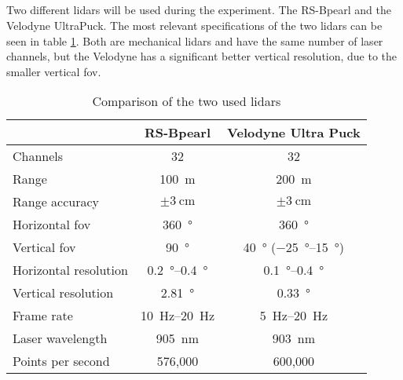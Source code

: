 \subsection{}
Two different \gls{lidar}s will be used during the experiment.
The RS-Bpearl and the Velodyne UltraPuck.
The most relevant specifications of the two \gls{lidar}s can be seen in table \ref{tab:lidar_datasheets}.
Both are mechanical \gls{lidar}s and have the same number of laser channels, but the Velodyne has a significant better vertical resolution, due to the smaller vertical \gls{fov}.
\begin{table}[ht]
	\centering
	\caption{Comparison of the two used \gls{lidar}s \cite{RoboSense2020}\cite{Rev}}
	\label{tab:lidar_datasheets}
	\begin{tabular}[t]{lcc}
	\toprule
	&\textbf{RS-Bpearl} & \textbf{Velodyne Ultra Puck}\\
	\midrule
	Channels 					& 32 							& 32\\
	Range 						& \SI{100}{\metre}				& \SI{200}{\metre}\\
	Range accuracy				& $\pm\SI{3}{\centi\metre}$		& $\pm\SI{3}{\centi\metre}$\\
	Horizontal \gls{fov}	& \SI{360}{\degree}				& \SI{360}{\degree}\\
	Vertical \gls{fov} 	& \SI{90}{\degree} 				& \SI{40}{\degree} (\SIrange{-25}{15}{\degree})\\
	Horizontal resolution		& \SIrange{0.2}{0.4}{\degree} 	& \SIrange{0.1}{0.4}{\degree}\\
	Vertical resolution			& \SI{2.81}{\degree} 			& \SI{0.33}{\degree}\\
	Frame rate 					& \SIrange{10}{20}{\hertz}		& \SIrange{5}{20}{\hertz}\\
	Laser wavelength 			& \SI{905}{\nano\metre} 		& \SI{903}{\nano\metre}\\
	Points per second 			& 576,000						& 600,000		\\
	\bottomrule
	\end{tabular}
	\end{table}%




